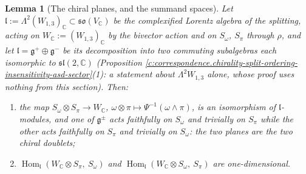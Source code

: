 \documentclass[11pt]{article}
\newtheorem{lemma}[theorem]{Lemma}
\theoremstyle{definition}
\theoremstyle{plain}
\newcommand{\changedmark}[2]{\marginpar{\raggedright\scriptsize\color{#1}#2}}
\providecommand{\C}{}\renewcommand{\C}{\mathbb{C}}
\providecommand{\Som}{}\renewcommand{\Som}{S_\omega}
\providecommand{\Spi}{}\renewcommand{\Spi}{S_\pi}
\begin{document}
\begin{lemma}[The chiral planes, and the summand spaces]\label{c:correspondence.chiral-planes-summand-spaces}
\changedmark{gray}{reworded}
Let $\mathfrak{l} := \Lambda^2 (W_{1,3})_\C \subset \mathfrak{so}(V_\C)$ be the complexified Lorentz algebra of the splitting, acting on $W_\C := (W_{1,3})_\C$ by the bivector action and on $\Som$, $\Spi$ through $\rho$, and let $\mathfrak{l} = \mathfrak{g}^+ \oplus \mathfrak{g}^-$ be its decomposition into two commuting subalgebras each isomorphic to $\mathfrak{sl}(2,\C)$ (Proposition \ref{c:correspondence.chirality-split-ordering-insensitivity-asd-sector}(1): a statement about $\Lambda^2 W_{1,3}$ alone, whose proof uses nothing from this section). Then:
\begin{enumerate}
\item the map $\Som \otimes \Spi \to W_\C$, $\omega\otimes\pi \mapsto \Psi^{-1}(\omega\wedge\pi)$, is an isomorphism of $\mathfrak{l}$-modules, and one of $\mathfrak{g}^\pm$ acts faithfully on $\Som$ and trivially on $\Spi$ while the other acts faithfully on $\Spi$ and trivially on $\Som$: the two planes are the two chiral doublets;
\item $\operatorname{Hom}_{\mathfrak{l}}(W_\C \otimes \Spi,\ \Som)$ and $\operatorname{Hom}_{\mathfrak{l}}(W_\C \otimes \Som,\ \Spi)$ are one-dimensional.
\end{enumerate}
\end{lemma}
\end{document}
